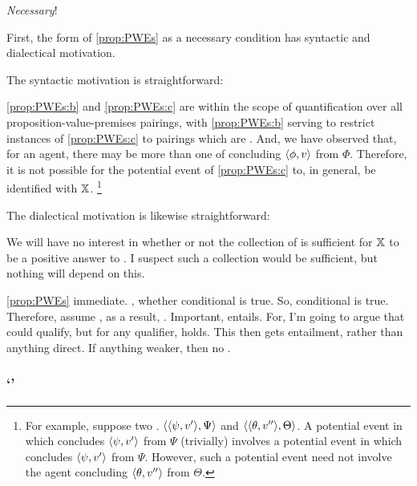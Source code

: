 \begin{note}
  \emph{Necessary}!

  First, the form of \autoref{prop:PWEs} as a necessary condition has syntactic and dialectical motivation.

  The syntactic motivation is straightforward:
  \begin{shiftpar}
    \ref{prop:PWEs:b} and \ref{prop:PWEs:c} are within the scope of quantification over all proposition-value-premises pairings, with \ref{prop:PWEs:b} serving to restrict instances of \ref{prop:PWEs:c} to pairings which are \requ{}.
    And, we have observed that, for an agent, there may be more than one \requ{} of concluding \(\pv{\phi}{v}\) from \(\Phi\).
    Therefore, it is not possible for the potential event of \ref{prop:PWEs:c} to, in general, be identified with \(\qzSaV{}\).%
    \footnote{
      For example, suppose two .
      \(\pvp{\psi}{v'}{\Psi}\) and \(\pvp{\theta}{v''}{\Theta}\).
      A potential event in which \vAgent{} concludes \(\pv{\psi}{v'}\) from \(\Psi\) (trivially) involves a potential event in which \vAgent{} concludes \(\pv{\psi}{v'}\) from \(\Psi\).
      However, such a potential event need not involve the agent concluding \(\pv{\theta}{v''}\) from \(\Theta\).
    }
  \end{shiftpar}

  The dialectical motivation is likewise straightforward:

  \begin{shiftpar}
    We will have no interest in whether or not the collection of  is sufficient for \(\qzSaV{}\) to be a positive answer to \qzS{}.
    I suspect such a collection would be sufficient, but nothing will depend on this.
  \end{shiftpar}
\end{note}

\begin{note}
  \autoref{prop:PWEs} immediate.
  \qzS{}, whether conditional is true.
  So, conditional is true.
  Therefore, assume \requ{}, as a result, \fc{}.
  {
    \color{red}
    Important, entails.
    For, I'm going to argue that could qualify, but for any qualifier, \ptivityQ{} holds.
    This then gets entailment, rather than anything direct.
  }
  If anything weaker, then no \fc{}.
\end{note}

\subsubsection{`'}
\label{cha:zSpA:sec:the-argument}


